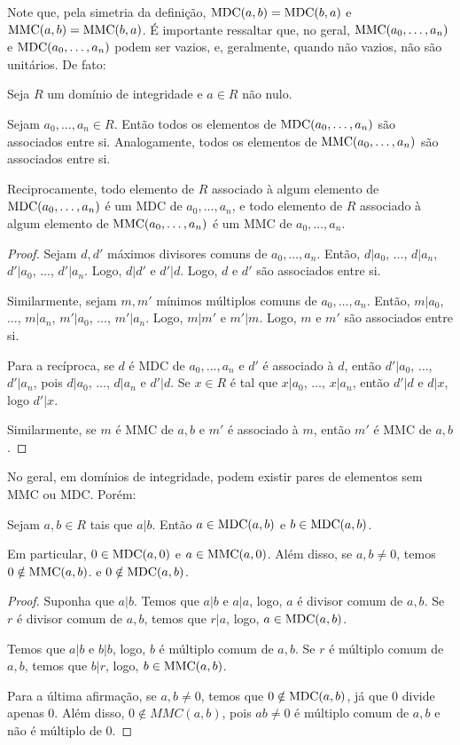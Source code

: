 Note que, pela simetria da definição, $\operatorname{MDC}(a, b)=\operatorname{MDC}(b, a)$ e $\operatorname{MMC}(a, b)=\operatorname{MMC}(b, a)$.
É importante ressaltar que, no geral, $\operatorname{MMC}(a_0, \dots, a_n)$ e $\operatorname{MDC}(a_0, \dots, a_n)$ podem ser vazios, e, geralmente, quando não vazios, não são unitários.
De fato:
\begin{lemma}
    Seja $R$ um domínio de integridade e $a \in R$ não nulo.

    Sejam $a_0, \dots, a_n \in R$.
    Então todos os elementos de $\operatorname{MDC}(a_0, \dots, a_n)$ são associados entre si.
    Analogamente, todos os elementos de $\operatorname{MMC}(a_0, \dots, a_n)$ são associados entre si.

    Reciprocamente, todo elemento de $R$ associado à algum elemento de $\operatorname{MDC}(a_0, \dots, a_n)$ é um MDC de $a_0, \dots, a_n$, e todo elemento de $R$ associado à algum elemento de $\operatorname{MMC}(a_0, \dots, a_n)$ é um MMC de $a_0, \dots, a_n$.
\end{lemma}
\begin{proof}
Sejam $d, d'$ máximos divisores comuns de $a_0, \dots, a_n$.
Então, $d|a_0$, $\dots$, $d|a_n$, $d'|a_0$, $\dots$, $d'|a_n$.
Logo, $d|d'$ e $d'|d$.
Logo, $d$ e $d'$ são associados entre si.

Similarmente, sejam $m, m'$ mínimos múltiplos comuns de $a_0, \dots, a_n$.
Então, $m|a_0$, $\dots$, $m|a_n$, $m'|a_0$, $\dots$, $m'|a_n$.
Logo, $m|m'$ e $m'|m$.
Logo, $m$ e $m'$ são associados entre si.

Para a recíproca, se $d$ é MDC de $a_0, \dots, a_n$ e $d'$ é associado à $d$, então $d'|a_0$, $\dots$, $d'|a_n$, pois $d|a_0$, $\dots$, $d|a_n$ e $d'|d$.
Se $x\in R$ é tal que $x|a_0$, $\dots$, $x|a_n$, então $d'|d$ e $d|x$, logo $d'|x$.

Similarmente, se $m$ é MMC de $a, b$ e $m'$ é associado à $m$, então $m'$ é MMC de $a, b$.
\end{proof}
No geral, em domínios de integridade, podem existir pares de elementos sem MMC ou MDC.
Porém:

\begin{lemma}
Sejam $a, b \in R$ tais que $a|b$.
Então $a \in \operatorname{MDC}(a, b)$ e $b \in \operatorname{MDC}(a, b)$.

Em particular, $0 \in \operatorname{MDC}(a, 0)$ e $a \in \operatorname{MMC}(a, 0)$.
Além disso, se $a, b \neq 0$, temos $0 \notin \operatorname{MMC}(a, b)$. e $0 \notin \operatorname{MDC}(a, b)$.
\end{lemma}

\begin{proof}
    Suponha que $a|b$.
    Temos que $a|b$ e $a|a$, logo, $a$ é divisor comum de $a, b$.
    Se $r$ é divisor comum de $a, b$, temos que $r|a$, logo, $a \in \operatorname{MDC}(a, b)$.

    Temos que $a|b$ e $b|b$, logo, $b$ é múltiplo comum de $a, b$.
    Se $r$ é múltiplo comum de $a, b$, temos que $b|r$, logo, $b \in \operatorname{MMC}(a, b)$.

    Para a última afirmação, se $a, b \neq 0$, temos que $0 \notin \operatorname{MDC}(a, b)$, já que $0$ divide apenas $0$.
    Além disso, $0 \notin MMC(a, b)$, pois $ab\neq 0$ é múltiplo comum de $a, b$ e não é múltiplo de $0$.
\end{proof}


